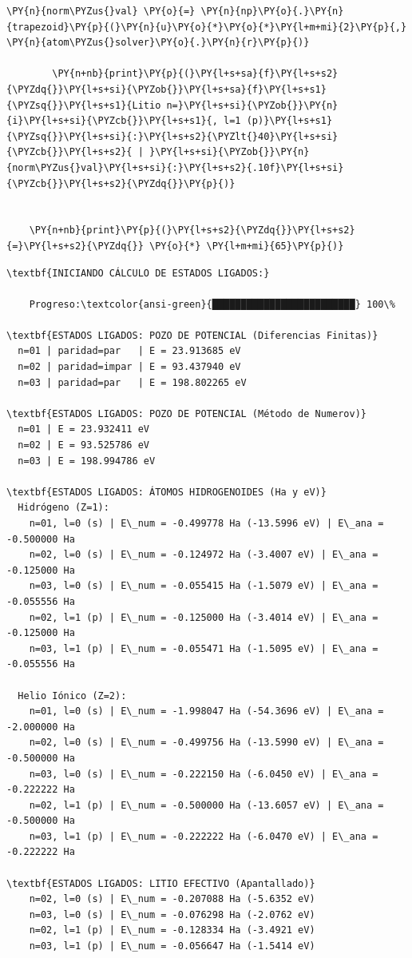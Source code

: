 \documentclass[11pt]{article}
\makeatletter
\def\PY@reset{\let\PY@it=\relax \let\PY@bf=\relax \let\PY@ul=\relax \let\PY@tc=\relax \let\PY@bc=\relax \let\PY@ff=\relax}
\def\PY@tok#1{\csname PY@tok@#1\endcsname}
\def\PY@toks#1+{\ifx\relax#1\empty\else \PY@tok{#1}\expandafter\PY@toks\fi}
\def\PY@do#1{\PY@bc{\PY@tc{\PY@ul{\PY@it{\PY@bf{\PY@ff{#1}}}}}}}
\def\PY#1#2{\PY@reset\PY@toks#1+\relax+\PY@do{#2}}
\makeatother
\begin{document}
\begin{tcolorbox}[breakable, size=fbox, boxrule=1pt, pad at break*=1mm,colback=cellbackground, colframe=cellborder]
\begin{Verbatim}[commandchars=\\\{\}]
        \PY{n}{norm\PYZus{}val} \PY{o}{=} \PY{n}{np}\PY{o}{.}\PY{n}{trapezoid}\PY{p}{(}\PY{n}{u}\PY{o}{*}\PY{o}{*}\PY{l+m+mi}{2}\PY{p}{,} \PY{n}{atom\PYZus{}solver}\PY{o}{.}\PY{n}{r}\PY{p}{)}

        \PY{n+nb}{print}\PY{p}{(}\PY{l+s+sa}{f}\PY{l+s+s2}{\PYZdq{}}\PY{l+s+si}{\PYZob{}}\PY{l+s+sa}{f}\PY{l+s+s1}{\PYZsq{}}\PY{l+s+s1}{Litio n=}\PY{l+s+si}{\PYZob{}}\PY{n}{i}\PY{l+s+si}{\PYZcb{}}\PY{l+s+s1}{, l=1 (p)}\PY{l+s+s1}{\PYZsq{}}\PY{l+s+si}{:}\PY{l+s+s2}{\PYZlt{}40}\PY{l+s+si}{\PYZcb{}}\PY{l+s+s2}{ | }\PY{l+s+si}{\PYZob{}}\PY{n}{norm\PYZus{}val}\PY{l+s+si}{:}\PY{l+s+s2}{.10f}\PY{l+s+si}{\PYZcb{}}\PY{l+s+s2}{\PYZdq{}}\PY{p}{)}


    \PY{n+nb}{print}\PY{p}{(}\PY{l+s+s2}{\PYZdq{}}\PY{l+s+s2}{=}\PY{l+s+s2}{\PYZdq{}} \PY{o}{*} \PY{l+m+mi}{65}\PY{p}{)}

\end{Verbatim}

\end{tcolorbox} 

\begin{Verbatim}[commandchars=\\\{\}]
\textbf{INICIANDO CÁLCULO DE ESTADOS LIGADOS:}

    Progreso:\textcolor{ansi-green}{█████████████████████████} 100\%

\textbf{ESTADOS LIGADOS: POZO DE POTENCIAL (Diferencias Finitas)}
  n=01 | paridad=par   | E = 23.913685 eV
  n=02 | paridad=impar | E = 93.437940 eV
  n=03 | paridad=par   | E = 198.802265 eV

\textbf{ESTADOS LIGADOS: POZO DE POTENCIAL (Método de Numerov)}
  n=01 | E = 23.932411 eV
  n=02 | E = 93.525786 eV
  n=03 | E = 198.994786 eV

\textbf{ESTADOS LIGADOS: ÁTOMOS HIDROGENOIDES (Ha y eV)}
  Hidrógeno (Z=1):
    n=01, l=0 (s) | E\_num = -0.499778 Ha (-13.5996 eV) | E\_ana = -0.500000 Ha
    n=02, l=0 (s) | E\_num = -0.124972 Ha (-3.4007 eV) | E\_ana = -0.125000 Ha
    n=03, l=0 (s) | E\_num = -0.055415 Ha (-1.5079 eV) | E\_ana = -0.055556 Ha
    n=02, l=1 (p) | E\_num = -0.125000 Ha (-3.4014 eV) | E\_ana = -0.125000 Ha
    n=03, l=1 (p) | E\_num = -0.055471 Ha (-1.5095 eV) | E\_ana = -0.055556 Ha

  Helio Iónico (Z=2):
    n=01, l=0 (s) | E\_num = -1.998047 Ha (-54.3696 eV) | E\_ana = -2.000000 Ha
    n=02, l=0 (s) | E\_num = -0.499756 Ha (-13.5990 eV) | E\_ana = -0.500000 Ha
    n=03, l=0 (s) | E\_num = -0.222150 Ha (-6.0450 eV) | E\_ana = -0.222222 Ha
    n=02, l=1 (p) | E\_num = -0.500000 Ha (-13.6057 eV) | E\_ana = -0.500000 Ha
    n=03, l=1 (p) | E\_num = -0.222222 Ha (-6.0470 eV) | E\_ana = -0.222222 Ha

\textbf{ESTADOS LIGADOS: LITIO EFECTIVO (Apantallado)}
    n=02, l=0 (s) | E\_num = -0.207088 Ha (-5.6352 eV)
    n=03, l=0 (s) | E\_num = -0.076298 Ha (-2.0762 eV)
    n=02, l=1 (p) | E\_num = -0.128334 Ha (-3.4921 eV)
    n=03, l=1 (p) | E\_num = -0.056647 Ha (-1.5414 eV)
\end{Verbatim}
\end{document}
